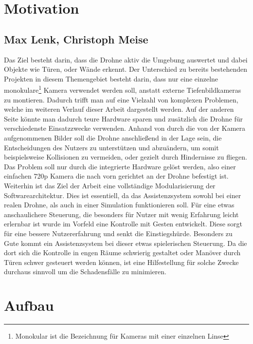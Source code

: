 \section{Motivation} 
\subsection*{Max Lenk, Christoph Meise}
Das Ziel besteht darin, dass die Drohne aktiv die Umgebung auswertet und dabei Objekte wie Türen, oder Wände erkennt. Der Unterschied zu bereits bestehenden Projekten in diesem Themengebiet besteht darin, dass nur eine einzelne monokulare\footnote{Monokular ist die Bezeichnung für Kameras mit einer einzelnen Linse} Kamera verwendet werden soll, anstatt externe Tiefenbildkameras zu montieren. \newline
Dadurch trifft man auf eine Vielzahl von komplexen Problemen, welche im weiteren Verlauf dieser Arbeit dargestellt werden. Auf der anderen Seite könnte man dadurch teure Hardware sparen und zusätzlich die Drohne für verschiedenste Einsatzzwecke verwenden. \newline
Anhand von durch die von der Kamera aufgenommenen Bilder soll die Drohne anschließend in der Lage sein, die Entscheidungen des Nutzers zu unterstützen und abzuändern, um somit beispielsweise Kollisionen zu vermeiden, oder gezielt durch Hindernisse zu fliegen. \newline
Das Problem soll nur durch die integrierte Hardware gelöst werden, also einer einfachen 720p Kamera die nach vorn gerichtet an der Drohne befestigt ist. Weiterhin ist das Ziel der Arbeit eine vollständige Modularisierung der Softwarearchitektur. Dies ist essentiell, da das Assistenzsystem sowohl bei einer realen Drohne, als auch in einer Simulation funktionieren soll.\newline
Für eine etwas anschaulichere Steuerung, die besonders für Nutzer mit wenig Erfahrung leicht erlernbar ist wurde im Vorfeld eine Kontrolle mit Gesten entwickelt. Diese sorgt für eine bessere Nutzererfahrung und senkt die Einstiegshürde.
Besonders zu Gute kommt ein Assistenzsystem bei dieser etwas spielerischen Steuerung. Da die dort sich die Kontrolle in engen  Räume schwierig gestaltet oder Manöver durch Türen schwer gesteuert werden können, ist eine Hilfestellung für solche Zwecke durchaus sinnvoll um die Schadensfälle zu minimieren. 

\section{Aufbau}
